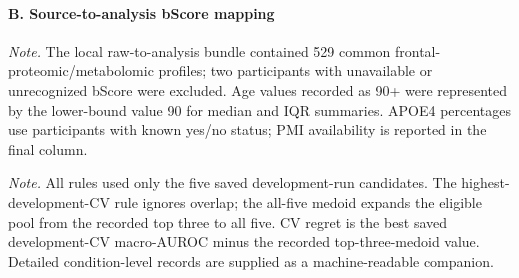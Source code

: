 

\paragraph*{B. Source-to-analysis bScore mapping}



{\footnotesize\noindent\textit{Note.} The local raw-to-analysis bundle contained 529 common frontal-proteomic/metabolomic profiles; two participants with unavailable or unrecognized bScore were excluded. Age values recorded as 90+ were represented by the lower-bound value 90 for median and IQR summaries. APOE4 percentages use participants with known yes/no status; PMI availability is reported in the final column.\par}



{\footnotesize\noindent\textit{Note.} All rules used only the five saved development-run candidates. The highest-development-CV rule ignores overlap; the all-five medoid expands the eligible pool from the recorded top three to all five. CV regret is the best saved development-CV macro-AUROC minus the recorded top-three-medoid value. Detailed condition-level records are supplied as a machine-readable companion.\par}




















